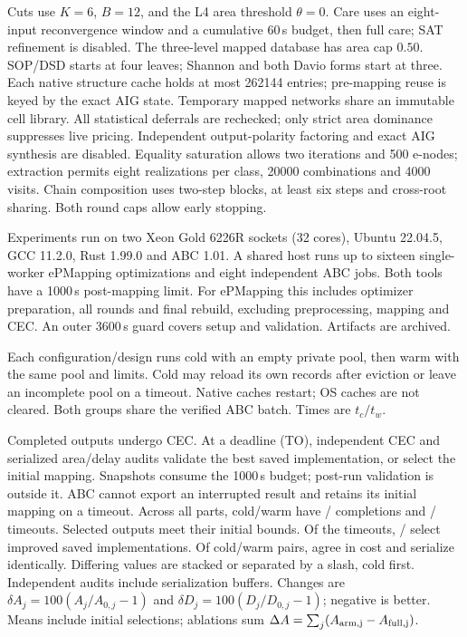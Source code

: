 Cuts use $K=6$, $B=12$, and the L4 area threshold $\theta=0$. Care uses an eight-input reconvergence window and a cumulative 60\,s budget, then full care; SAT refinement is disabled. The three-level mapped database has area cap $0.50$. SOP/DSD starts at four leaves; Shannon and both Davio forms start at three. Each native structure cache holds at most 262144 entries; pre-mapping reuse is keyed by the exact AIG state. Temporary mapped networks share an immutable cell library. All statistical deferrals are rechecked; only strict area dominance suppresses live pricing. Independent output-polarity factoring and exact AIG synthesis are disabled. Equality saturation allows two iterations and 500 e-nodes; extraction permits eight realizations per class, 20000 combinations and 4000 visits. Chain composition uses two-step blocks, at least six steps and cross-root sharing. Both round caps allow early stopping.

Experiments run on two Xeon Gold 6226R sockets (32 cores), Ubuntu 22.04.5, GCC 11.2.0, Rust 1.99.0 and ABC 1.01. A shared host runs up to sixteen single-worker ePMapping optimizations and eight independent ABC jobs. Both tools have a 1000\,s post-mapping limit. For ePMapping this includes optimizer preparation, all rounds and final rebuild, excluding preprocessing, mapping and CEC. An outer 3600\,s guard covers setup and validation. Artifacts are archived.

Each configuration/design runs cold with an empty private pool, then warm with the same pool and limits. Cold may reload its own records after eviction or leave an incomplete pool on a timeout. Native caches restart; OS caches are not cleared. Both groups share the verified ABC batch. Times are $t_c/t_w$.

Completed outputs undergo CEC. At a deadline (TO), independent CEC and serialized area/delay audits validate the best saved implementation, or select the initial mapping. Snapshots consume the 1000\,s budget; post-run validation is outside it. ABC cannot export an interrupted result and retains its initial mapping on a timeout. Across all parts, cold/warm have \ColdCompleted{}/\WarmCompleted{} completions and \ColdMethodTimeouts{}/\WarmMethodTimeouts{} timeouts. Selected outputs meet their initial bounds. Of the timeouts, \ColdCheckpointSelections{}/\WarmCheckpointSelections{} select improved saved implementations. Of \ProfilePairs{} cold/warm pairs, \ProfileEqual{} agree in cost and \ProfileIdentical{} serialize identically. Differing values are stacked or separated by a slash, cold first. Independent audits include serialization buffers. Changes are $\delta A_j=100(A_j/A_{0,j}-1)$ and $\delta D_j=100(D_j/D_{0,j}-1)$; negative is better. Means include initial selections; ablations sum $\Delta A=\sum_j(A_{\rm arm,j}-A_{\rm full,j})$.

